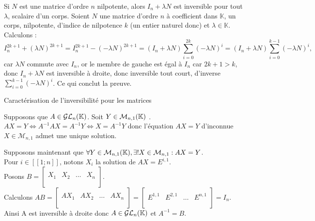 \documentclass{article}
\renewenvironment{question_kholle}[2][ ]
{
	\subsection{\texorpdfstring{#2}{}}
	\notblank{#1}
	{
		\noindent #1
		\bigbreak
	}
	{}
	\begin{proof}
}
{
	\end{proof}
}
\begin{document}
	\begin{question_kholle}
		{Si $N$ est une matrice d'ordre $n$ nilpotente, alors $I_n + \lambda N$ est inversible pour tout $\lambda$, scalaire d'un corps.}
		Soient $N$ une matrice d'ordre $n$ à coefficient dans $\mathbb{K}$, un corps, nilpotente, d'indice de nilpotence $k$ (un entier naturel donc) et $\lambda \in \mathbb{K}$. Calculons : 
		\[
		I_n^{2k+1} + (\lambda N)^{2k+1} = I_n^{2k+1} - (- \lambda N)^{2k+1} = (I_n + \lambda N)\sum_{i=0}^{2k}(-\lambda N)^i =  (I_n + \lambda N)\sum_{i=0}^{k-1}(-\lambda N)^i,
		\]
		car $\lambda N$ commute avec $I_n$, or le membre de gauche est égal à $I_n$ car $2k+1 > k$, donc $I_n + \lambda N$ est inversible à droite, donc inversible tout court, d'inverse $\sum_{i=0}^{k-1}(-\lambda N)^i$. Ce qui conclut la preuve.
	\end{question_kholle}
	
	\begin{question_kholle}
		[$A \in \mathcal{M}_n(\K)$ est inversible si et seulement si pour tout $Y \in \mathcal{M}_{n,1}(\K)$, l'équation $AX = Y$ d'inconnue $X \in \mathcal{M}_{n,1}$ admet une unique solution.
		\begin{equation}
			\forall A \mathcal{M}_n(\K),
			A \in \mathcal{GL}_n(\K) \iff
			\forall Y \in \mathcal{M}_{n,1}(\K), \exists ! X \in \mathcal{M}_{n,1} : AX = Y
		\end{equation}]
		{Caractérisation de l'inversibilité pour les matrices}
		
		Supposons que $A \in \mathcal{GL}_n(\mathbb K)$.
		Soit $Y \in \mathcal{M}_{n,1}(\K)$ \fq. \\
		$AX = Y \iff A^{-1}AX = A^{-1}Y \iff X = A^{-1}Y$ donc l'équation $AX = Y$ d'inconnue $X \in \mathcal{M}_{n,1}$ admet une unique solution.
		
		Supposons maintenant que $\forall Y \in \mathcal{M}_{n,1}(\mathbb K), \exists ! X \in \mathcal{M}_{n,1} : AX = Y$. \\
		Pour $i \in [\![1;n]\!]$, notons  $X_i$ la solution de $AX = E^{i,1}$. \\
		Posons $\displaystyle B = \left[ \begin{array}{c|c|c|c}
			&&&\\
			X_1 & X_2 & \ldots & X_n \\
			&&&\\
		\end{array} \right]$. \\
		Calculons $\displaystyle AB
		= \left[ \begin{array}{c|c|c|c}
			&&&\\
			AX_1 & AX_2 & \ldots & AX_n \\
			&&&\\
		\end{array} \right]
		= \left[ \begin{array}{c|c|c|c}
			&&&\\
			E^{1,1} & E^{2,1} & \ldots & E^{n,1} \\
			&&&\\
		\end{array} \right]
		= I_n$. \\
		Ainsi A est inversible à droite donc $A \in \mathcal{GL}_n(\mathbb K)$ et $A^{-1} = B$.
	\end{question_kholle}
	
\end{document}
